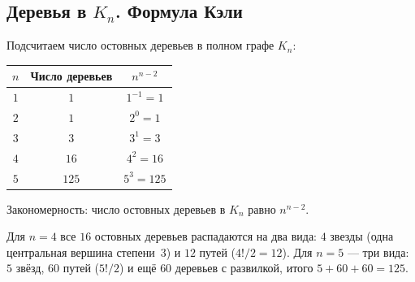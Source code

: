 \subsection{Деревья в \texorpdfstring{$K_n$}{Kn}. Формула Кэли}

Подсчитаем число остовных деревьев в полном графе $K_n$:

\begin{center}
	\begin{tabular}{c c c}
		\toprule
		$n$ & Число деревьев & $n^{n-2}$ \\
		\midrule
		$1$ & $1$ & $1^{-1} = 1$ \\
		$2$ & $1$ & $2^{0} = 1$ \\
		$3$ & $3$ & $3^{1} = 3$ \\
		$4$ & $16$ & $4^{2} = 16$ \\
		$5$ & $125$ & $5^{3} = 125$ \\
		\bottomrule
	\end{tabular}
\end{center}

Закономерность: число остовных деревьев в $K_n$ равно $n^{n-2}$.

\begin{Remark}{}{}
	Для $n=4$ все $16$ остовных деревьев распадаются на два вида:
	$4$ звезды (одна центральная вершина степени~$3$) и $12$ путей ($4!/2 = 12$).
	Для $n=5$ — три вида: $5$ звёзд, $60$ путей ($5!/2$) и ещё $60$ деревьев с развилкой, итого $5 + 60 + 60 = 125$.

	\begin{center}
	\end{center}
\end{Remark}

